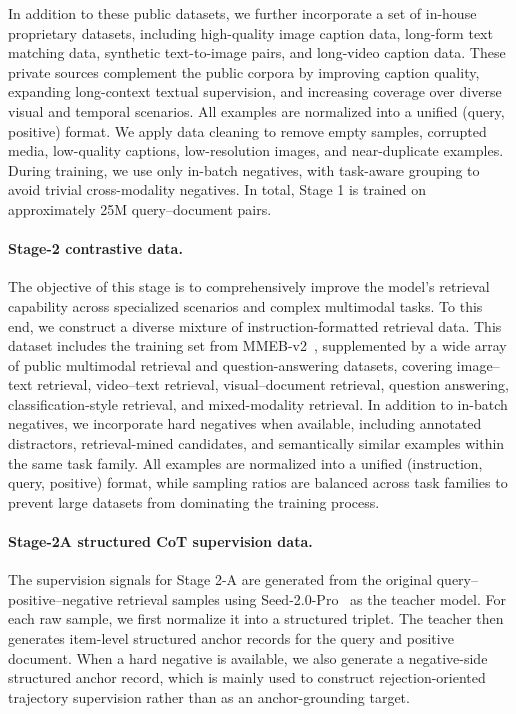 In addition to these public datasets, we further incorporate a set of in-house proprietary datasets, including high-quality image caption data, long-form text matching data, synthetic text-to-image pairs, and long-video caption data. These private sources complement the public corpora by improving caption quality, expanding long-context textual supervision, and increasing coverage over diverse visual and temporal scenarios. All examples are normalized into a unified (query, positive) format. We apply data cleaning to remove empty samples, corrupted media, low-quality captions, low-resolution images, and near-duplicate examples. During training, we use only in-batch negatives, with task-aware grouping to avoid trivial cross-modality negatives. In total, Stage 1 is trained on approximately 25M query--document pairs.

\paragraph{Stage-2 contrastive data.}
The objective of this stage is to comprehensively improve the model's retrieval capability across specialized scenarios and complex multimodal tasks. To this end, we construct a diverse mixture of instruction-formatted retrieval data. This dataset includes the training set from MMEB-v2~\cite{VLM2VecV2}, supplemented by a wide array of public multimodal retrieval and question-answering datasets, covering image--text retrieval, video--text retrieval, visual--document retrieval, question answering, classification-style retrieval, and mixed-modality retrieval. In addition to in-batch negatives, we incorporate hard negatives when available, including annotated distractors, retrieval-mined candidates, and semantically similar examples within the same task family. All examples are normalized into a unified (instruction, query, positive) format, while sampling ratios are balanced across task families to prevent large datasets from dominating the training process.

\paragraph{Stage-2A structured CoT supervision data.}
The supervision signals for Stage 2-A are generated from the original query--positive--negative retrieval samples using Seed-2.0-Pro~\cite{seed2} as the teacher model. For each raw sample, we first normalize it into a structured triplet. The teacher then generates item-level structured anchor records for the query and positive document. When a hard negative is available, we also generate a negative-side structured anchor record, which is mainly used to construct rejection-oriented trajectory supervision rather than as an anchor-grounding target.


